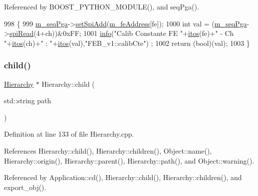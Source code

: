 Referenced by B\+O\+O\+S\+T\+\_\+\+P\+Y\+T\+H\+O\+N\+\_\+\+M\+O\+D\+U\+L\+E(), and seq\+Pga().


\begin{DoxyCode}
998                                      \{
999   \hyperlink{classFEB__v1_a6c7804ac86796f233a8393043adf2e77}{m\_seqPga}->\hyperlink{classSeqPGA_ac998ce3a6d9b5f2e88cc8393f8c1df53}{setSpiAdd}(\hyperlink{classFEB__v1_a4e1945c2d5b434125f375e9d0fc6d99f}{m\_feAddress}[fe]);
1000   \textcolor{keywordtype}{int} val = (\hyperlink{classFEB__v1_a6c7804ac86796f233a8393043adf2e77}{m\_seqPga}->\hyperlink{classSeqPGA_ab3d0e5e5d4014bc7a92588a76b8713d4}{spiRead}(4+ch))&0xFF;
1001   \hyperlink{classObject_a644fd329ea4cb85f54fa6846484b84a8}{info}(\textcolor{stringliteral}{"Calib Constante FE "}+\hyperlink{Tools_8h_af330027dbdafb9a30768b3613c553e60}{itos}(fe)+\textcolor{stringliteral}{" - Ch "}+\hyperlink{Tools_8h_af330027dbdafb9a30768b3613c553e60}{itos}(ch)+\textcolor{stringliteral}{" : "}+\hyperlink{Tools_8h_af330027dbdafb9a30768b3613c553e60}{itos}(val),\textcolor{stringliteral}{"FEB\_v1::calibCte"})
      ;
1002   \textcolor{keywordflow}{return} (\textcolor{keywordtype}{bool})(val);
1003 \}
\end{DoxyCode}
\mbox{\label{classHierarchy_a1e207f973c694b538bf90107b4868817}} 
\subsubsection{\texorpdfstring{child()}{child()}}
{\footnotesize\ttfamily \hyperlink{classHierarchy}{Hierarchy} $\ast$ Hierarchy\+::child (\begin{DoxyParamCaption}\item[{std\+::string}]{path }\end{DoxyParamCaption})\hspace{0.3cm}{\ttfamily [inherited]}}



Definition at line 133 of file Hierarchy.\+cpp.



References Hierarchy\+::child(), Hierarchy\+::children(), Object\+::name(), Hierarchy\+::origin(), Hierarchy\+::parent(), Hierarchy\+::path(), and Object\+::warning().



Referenced by Application\+::cd(), Hierarchy\+::child(), Hierarchy\+::children(), and export\+\_\+obj().


